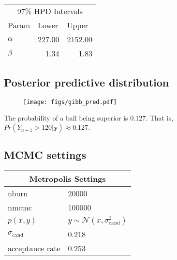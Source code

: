 \documentclass[12pt]{article}
\newcommand{\m}[1]{\mathbf{\bm{#1}}}
\begin{document}
\begin{center}
\begin{tabular}{l|rr}
\multicolumn{3}{c}{97\% HPD Intervals} \\
Param & \multicolumn{1}{l}{Lower} & \multicolumn{1}{l}{Upper} \\ \hline
$\alpha$  & 227.00 & 2152.00 \\
$\beta$   & 1.34 & 1.83 \\
\end{tabular}
\end{center}

\subsection{Posterior predictive distribution}

\begin{figure}[H]
    \centering
    \texttt{[image: figs/gibb\_pred.pdf]}
\end{figure}

\noindent The probability of a ball being superior is $0.127$. That is, $Pr(Y_{n+1} > 120|\m{y}) \approx 0.127$.

\subsection{MCMC settings}

\begin{center}
\begin{tabular}{ll}
\multicolumn{2}{c}{Metropolis Settings} \\ \hline \smallskip
nburn            & 20000 \\ \smallskip
nmcmc            & 100000 \\ \smallskip
$p(x, y)$ & $y\sim\mathcal{N}(x, \sigma_\mathrm{cand}^2)$ \\ \smallskip
$\sigma_{\mathrm{cand}} $ & 0.218 \\ \smallskip
acceptance rate  & 0.253 \\
\end{tabular}
\end{center}
\end{document}
